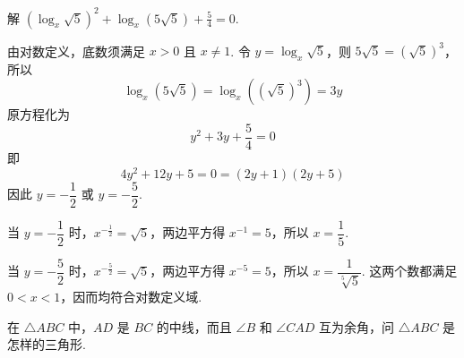 \begin{problem}
解 \(\left( \log_x\sqrt{5} \right)^{2}+\log_x\left(5\sqrt{5}\right)+\frac{5}{4}=0\).
\end{problem}

\begin{solution}
由对数定义，底数须满足 \(x>0\) 且 \(x\ne1\). 令
\(y=\log_x\sqrt{5}\)，则 \(5\sqrt{5}=(\sqrt{5})^3\)，所以
\[
\log_x\left(5\sqrt{5}\right)=\log_x\left((\sqrt{5})^3\right)=3y
\]
原方程化为
\[
y^2+3y+\frac54=0
\]
即
\[
4y^2+12y+5=0=(2y+1)(2y+5)
\]
因此 \(y=-\dfrac12\) 或 \(y=-\dfrac52\).

当 \(y=-\dfrac12\) 时，\(x^{-\frac{1}{2}}=\sqrt5\)，两边平方得 \(x^{-1}=5\)，所以 \(x=\dfrac15\).

当 \(y=-\dfrac52\) 时，\(x^{-\frac{5}{2}}=\sqrt5\)，两边平方得 \(x^{-5}=5\)，所以 \(x=\dfrac{1}{\sqrt[5]{5}}\). 这两个数都满足 \(0<x<1\)，因而均符合对数定义域.
\end{solution}

\begin{problem}
在 \(\triangle ABC\) 中，\(AD\) 是 \(BC\) 的中线，而且 \(\angle B\) 和 \(\angle CAD\) 互为余角，问 \(\triangle ABC\) 是怎样的三角形.
\end{problem}

